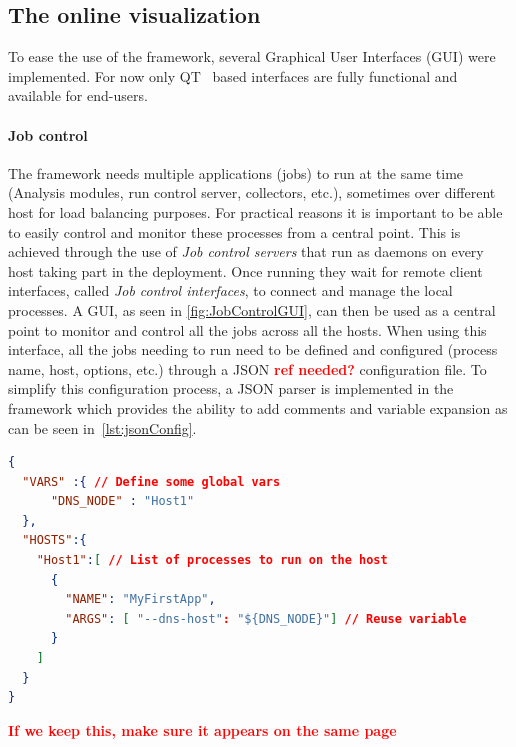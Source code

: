 \documentclass{webofc}
\begin{document}
\subsection{The online visualization}
\label{subsec:vis}

To ease the use of the framework, several Graphical User Interfaces (GUI) were implemented. For now only QT~\cite{QT} based interfaces are fully functional and available for end-users. 

\paragraph{Job control}\label{par:JobControl}

The framework needs multiple applications (jobs) to run at the same time (Analysis modules, run control server, collectors, etc.), sometimes over different host for load balancing purposes. For practical reasons it is important to be able to easily control and monitor these processes from a central point. This is achieved through the use of \textit{Job control servers} that run as daemons on every host taking part in the deployment. Once running they wait for remote client interfaces, called \textit{Job control interfaces}, to connect and manage the local processes. A GUI, as seen in \autoref{fig:JobControlGUI}, can then be used as a central point to monitor and control all the jobs across all the hosts. When using this interface, all the jobs needing to run need to be defined and configured (process name, host, options, etc.) through a JSON \textcolor{red}{\textbf{ref needed?}} configuration file. To simplify this configuration process, a JSON parser is implemented in the framework which provides the ability to add comments and variable expansion as can be seen in~\autoref{lst:jsonConfig}.

\begin{lstlisting}[label={lst:jsonConfig}, language=json]
{
  "VARS" :{ // Define some global vars
      "DNS_NODE" : "Host1"
  },
  "HOSTS":{ 
    "Host1":[ // List of processes to run on the host
      { 
        "NAME": "MyFirstApp",
        "ARGS": [ "--dns-host": "${DNS_NODE}"] // Reuse variable
      }
    ]
  }
}
\end{lstlisting}
\textcolor{red}{\textbf{If we keep this, make sure it appears on the same page}}
\end{document}
